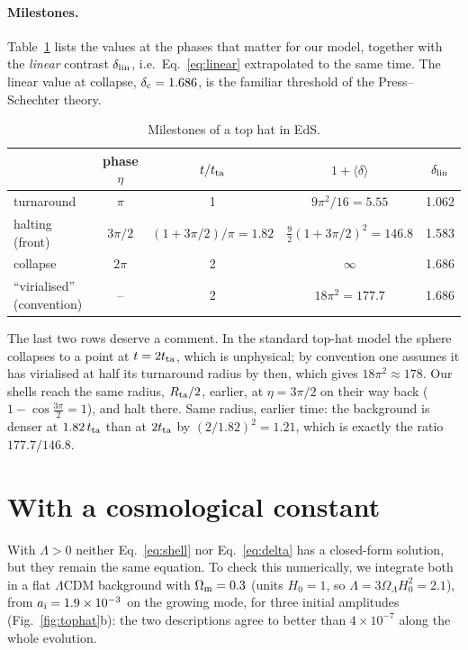 \documentclass[11pt,a4paper]{article}
\newcommand{\md}{\langle\delta\rangle}
\begin{document}
\paragraph{Milestones.} Table~\ref{tab:milestones} lists the values at
the phases that matter for our model, together with the \emph{linear}
contrast $\delta_{\rm lin}$, i.e.\ Eq.~\eqref{eq:linear} extrapolated to
the same time. The linear value at collapse, $\delta_{\rm c}=1.686$, is
the familiar threshold of the Press--Schechter theory.

\begin{table}[h]
\centering
\caption{Milestones of a top hat in EdS.}
\label{tab:milestones}
\begin{tabular}{lcccc}
\toprule
 & phase $\eta$ & $t/t_{\rm ta}$ & $1+\md$ & $\delta_{\rm lin}$\\
\midrule
turnaround & $\pi$ & 1 & $9\pi^{2}/16=5.55$ & 1.062\\
halting (front) & $3\pi/2$ & $(1+3\pi/2)/\pi=1.82$ & $\frac92(1+3\pi/2)^{2}=146.8$ & 1.583\\
collapse & $2\pi$ & 2 & $\infty$ & 1.686\\
``virialised'' (convention) & -- & 2 & $18\pi^{2}=177.7$ & 1.686\\
\bottomrule
\end{tabular}
\end{table}

The last two rows deserve a comment. In the standard top-hat model the
sphere collapses to a point at $t=2t_{\rm ta}$, which is unphysical; by
convention one assumes it has virialised at half its turnaround radius
by then, which gives $18\pi^{2}\approx178$. Our shells reach the same
radius, $R_{\rm ta}/2$, earlier, at $\eta=3\pi/2$ on their way back
($1-\cos\frac{3\pi}{2}=1$), and halt there. Same radius, earlier time:
the background is denser at $1.82\,t_{\rm ta}$ than at $2t_{\rm ta}$ by
$(2/1.82)^{2}=1.21$, which is exactly the ratio $177.7/146.8$.

\section{With a cosmological constant}\label{sec:lambda}

With $\Lambda>0$ neither Eq.~\eqref{eq:shell} nor Eq.~\eqref{eq:delta}
has a closed-form solution, but they remain the same equation. To check
this numerically, we integrate both in a flat $\Lambda$CDM background
with $\Omega_{\rm m}=0.3$ (units $H_{0}=1$, so $\Lambda=3\Omega_\Lambda
H_{0}^{2}=2.1$), from $a_{\rm i}=1.9\times10^{-3}$ on the growing mode,
for three initial amplitudes (Fig.~\ref{fig:tophat}b): the two
descriptions agree to better than $4\times10^{-7}$ along the whole
evolution.
\end{document}
